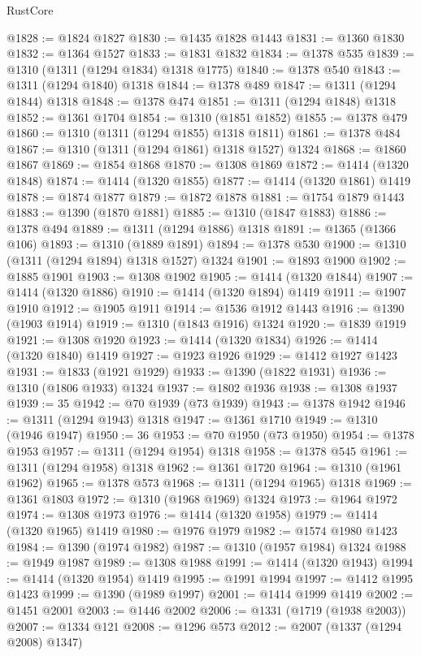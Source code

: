 \begin{lexlean}{RustCore}
\begin{coremodule}
@1828 := @1824 @1827
@1830 := @1435 @1828 @1443
@1831 := @1360 @1830
@1832 := @1364 @1527
@1833 := @1831 @1832
@1834 := @1378 @535
@1839 := @1310 (@1311 (@1294 @1834) @1318 @1775)
@1840 := @1378 @540
@1843 := @1311 (@1294 @1840) @1318
@1844 := @1378 @489
@1847 := @1311 (@1294 @1844) @1318
@1848 := @1378 @474
@1851 := @1311 (@1294 @1848) @1318
@1852 := @1361 @1704
@1854 := @1310 (@1851 @1852)
@1855 := @1378 @479
@1860 := @1310 (@1311 (@1294 @1855) @1318 @1811)
@1861 := @1378 @484
@1867 := @1310 (@1311 (@1294 @1861) @1318 @1527) @1324
@1868 := @1860 @1867
@1869 := @1854 @1868
@1870 := @1308 @1869
@1872 := @1414 (@1320 @1848)
@1874 := @1414 (@1320 @1855)
@1877 := @1414 (@1320 @1861) @1419
@1878 := @1874 @1877
@1879 := @1872 @1878
@1881 := @1754 @1879 @1443
@1883 := @1390 (@1870 @1881)
@1885 := @1310 (@1847 @1883)
@1886 := @1378 @494
@1889 := @1311 (@1294 @1886) @1318
@1891 := @1365 (@1366 @106)
@1893 := @1310 (@1889 @1891)
@1894 := @1378 @530
@1900 := @1310 (@1311 (@1294 @1894) @1318 @1527) @1324
@1901 := @1893 @1900
@1902 := @1885 @1901
@1903 := @1308 @1902
@1905 := @1414 (@1320 @1844)
@1907 := @1414 (@1320 @1886)
@1910 := @1414 (@1320 @1894) @1419
@1911 := @1907 @1910
@1912 := @1905 @1911
@1914 := @1536 @1912 @1443
@1916 := @1390 (@1903 @1914)
@1919 := @1310 (@1843 @1916) @1324
@1920 := @1839 @1919
@1921 := @1308 @1920
@1923 := @1414 (@1320 @1834)
@1926 := @1414 (@1320 @1840) @1419
@1927 := @1923 @1926
@1929 := @1412 @1927 @1423
@1931 := @1833 (@1921 @1929)
@1933 := @1390 (@1822 @1931)
@1936 := @1310 (@1806 @1933) @1324
@1937 := @1802 @1936
@1938 := @1308 @1937
@1939 := 35
@1942 := @70 @1939 (@73 @1939)
@1943 := @1378 @1942
@1946 := @1311 (@1294 @1943) @1318
@1947 := @1361 @1710
@1949 := @1310 (@1946 @1947)
@1950 := 36
@1953 := @70 @1950 (@73 @1950)
@1954 := @1378 @1953
@1957 := @1311 (@1294 @1954) @1318
@1958 := @1378 @545
@1961 := @1311 (@1294 @1958) @1318
@1962 := @1361 @1720
@1964 := @1310 (@1961 @1962)
@1965 := @1378 @573
@1968 := @1311 (@1294 @1965) @1318
@1969 := @1361 @1803
@1972 := @1310 (@1968 @1969) @1324
@1973 := @1964 @1972
@1974 := @1308 @1973
@1976 := @1414 (@1320 @1958)
@1979 := @1414 (@1320 @1965) @1419
@1980 := @1976 @1979
@1982 := @1574 @1980 @1423
@1984 := @1390 (@1974 @1982)
@1987 := @1310 (@1957 @1984) @1324
@1988 := @1949 @1987
@1989 := @1308 @1988
@1991 := @1414 (@1320 @1943)
@1994 := @1414 (@1320 @1954) @1419
@1995 := @1991 @1994
@1997 := @1412 @1995 @1423
@1999 := @1390 (@1989 @1997)
@2001 := @1414 @1999 @1419
@2002 := @1451 @2001
@2003 := @1446 @2002
@2006 := @1331 (@1719 (@1938 @2003))
@2007 := @1334 @121
@2008 := @1296 @573
@2012 := @2007 (@1337 (@1294 @2008) @1347)

\end{coremodule}
\end{lexlean}

